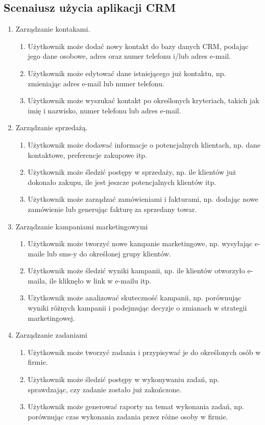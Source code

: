 \documentclass[12pt,a4paper]{article}
\begin{document}
\newpage

\subsection{Scenaiusz użycia aplikacji CRM}

\begin{enumerate}

\item Zarządzanie kontakami.
\begin{enumerate}
\item Użytkownik może dodać nowy kontakt do bazy danych CRM, podając jego dane osobowe, adres oraz numer telefonu i/lub adres e-mail.
\item Użytkownik może edytować dane istniejącego już kontaktu, np. zmieniając adres e-mail lub numer telefonu.
\item Użytkownik może wyszukać kontakt po określonych kryteriach, takich jak imię i nazwisko, numer telefonu lub adres e-mail.
\end{enumerate}

\item Zarządzanie sprzedażą.
\begin{enumerate}
\item Użytkownik może dodawać informacje o potencjalnych klientach, np. dane kontaktowe, preferencje zakupowe itp.
\item Użytkownik może śledzić postępy w sprzedaży, np. ile klientów już dokonało zakupu, ile jest jeszcze potencjalnych klientów itp.
\item Użytkownik może zarządzać zamówieniami i fakturami, np. dodając nowe zamówienie lub generując fakturę za sprzedany towar.
\end{enumerate}

\item{Zarządzanie kampaniami marketingowymi}
\begin{enumerate}
    \item Użytkownik może tworzyć nowe kampanie marketingowe, np. wysyłając e-maile lub sms-y do określonej grupy klientów.
    \item Użytkownik może śledzić wyniki kampanii, np. ile klientów otworzyło e-maila, ile kliknęło w link w e-mailu itp.
    \item Użytkownik może analizować skuteczność kampanii, np. porównując wyniki różnych kampanii i podejmując decyzje o zmianach w strategii marketingowej.
\end{enumerate}

\item{Zarządzanie zadaniami}
\begin{enumerate}
    \item Użytkownik może tworzyć zadania i przypisywać je do określonych osób w firmie.
    \item Użytkownik może śledzić postępy w wykonywaniu zadań, np. sprawdzając, czy zadanie zostało już zakończone.
    \item Użytkownik może generować raporty na temat wykonania zadań, np. porównując czas wykonania zadania przez różne osoby w firmie.
\end{enumerate}


\end{enumerate}
\end{document}
